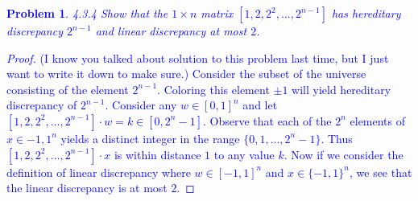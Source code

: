 \documentclass[11pt]{article}
\newtheorem{problem}{Problem}
\begin{document}
\textcolor{blue}{
\begin{problem}
4.3.4 Show that the $1 \times n$ matrix $[1,2,2^2,..., 2^{n-1}]$ has hereditary discrepancy $2^{n-1}$ and linear discrepancy at most $2$. 
\end{problem}
\begin{proof}
(I know you talked about solution to this problem last time, but I just want to write it down to make sure.) Consider the subset of the universe consisting of the element $2^{n-1}$. Coloring this element $\pm 1$ will yield hereditary discrepancy of $2^{n-1}$. Consider any $w \in [0,1]^n$ and let $[1,2,2^2, ..., 2^{n-1}]\cdot w = k \in [0, 2^{n}-1]$. Observe that each of the $2^{n}$ elements of $x \in {-1,1}^n$ yields a distinct integer in the range $\{0,1,..., 2^{n}-1\}$. Thus $[1,2,2^2, ..., 2^{n-1}] \cdot x$ is within distance $1$ to any value $k$. Now if we consider the definition of linear discrepancy where $w \in [-1,1]^n$ and $x \in \{-1,1\}^n$, we see that the linear discrepancy is at most $2$.     
\end{proof}
}
\end{document}
